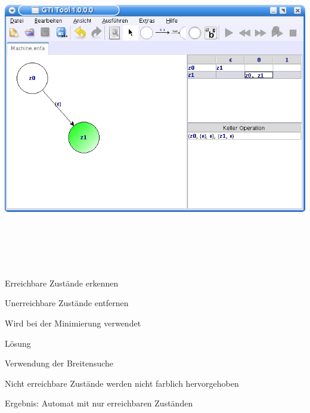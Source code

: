 {
  \begin{center}
    \includegraphics[height=14cm]{../images/machine_table.png}
  \end{center}
}


{
    \begin{itemgroup}{}
	\item Erreichbare Zustände erkennen
	\item Unerreichbare Zustände entfernen
	\item Wird bei der Minimierung verwendet
    \end{itemgroup}

    \begin{itemgroup}{Lösung}
	\item Verwendung der Breitensuche
	\item Nicht erreichbare Zustände werden nicht farblich hervorgehoben
	\item Ergebnis: Automat mit nur erreichbaren Zuständen
	\end{itemgroup}
    
    \vfill{}
}


